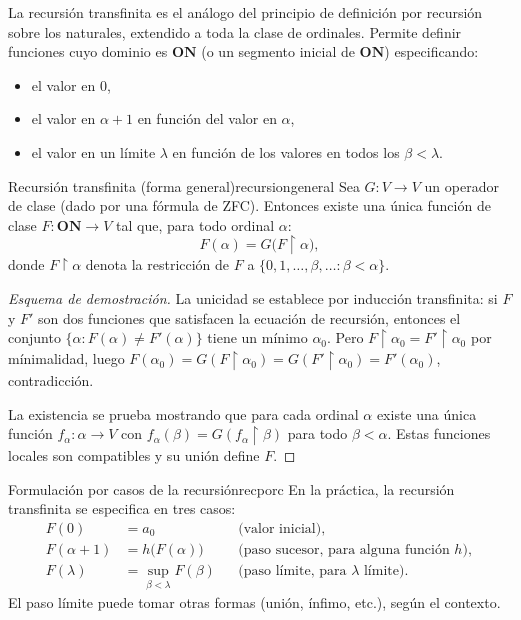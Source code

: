 La recursión transfinita es el análogo del principio de definición por recursión sobre los naturales, extendido a toda la clase de ordinales. Permite definir funciones cuyo dominio es $\mathbf{ON}$ (o un segmento inicial de $\mathbf{ON}$) especificando:
\begin{itemize}
  \item el valor en $0$,
  \item el valor en $\alpha + 1$ en función del valor en $\alpha$,
  \item el valor en un límite $\lambda$ en función de los valores en todos los $\beta < \lambda$.

\end{itemize}

\begin{teorema}{Recursión transfinita (forma general)}{recursiongeneral}
Sea $G: V \to V$ un operador de clase (dado por una fórmula de ZFC). Entonces existe una única función de clase $F: \mathbf{ON} \to V$ tal que, para todo ordinal $\alpha$:
\[
  F(\alpha) = G\bigl(F \upharpoonright \alpha\bigr),
\]
donde $F \upharpoonright \alpha$ denota la restricción de $F$ a $\{0, 1, \ldots, \beta, \ldots : \beta < \alpha\}$.
\end{teorema}

\begin{proof}[Esquema de demostración]
La unicidad se establece por inducción transfinita: si $F$ y $F'$ son dos funciones que satisfacen la ecuación de recursión, entonces el conjunto $\{\alpha : F(\alpha) \neq F'(\alpha)\}$ tiene un mínimo $\alpha_0$. Pero $F \upharpoonright \alpha_0 = F' \upharpoonright \alpha_0$ por mínimalidad, luego $F(\alpha_0) = G(F \upharpoonright \alpha_0) = G(F' \upharpoonright \alpha_0) = F'(\alpha_0)$, contradicción.

La existencia se prueba mostrando que para cada ordinal $\alpha$ existe una única función $f_\alpha: \alpha \to V$ con $f_\alpha(\beta) = G(f_\alpha \upharpoonright \beta)$ para todo $\beta < \alpha$. Estas funciones locales son compatibles y su unión define $F$.
\end{proof}

\begin{observacion}{Formulación por casos de la recursión}{recporc}
En la práctica, la recursión transfinita se especifica en tres casos:
\begin{align*}
  F(0) &= a_0 & &\text{(valor inicial)},\\
  F(\alpha + 1) &= h\bigl(F(\alpha)\bigr) & &\text{(paso sucesor, para alguna función } h\text{)},\\
  F(\lambda) &= \sup_{\beta < \lambda} F(\beta) & &\text{(paso límite, para } \lambda \text{ límite)}.
\end{align*}
El paso límite puede tomar otras formas (unión, ínfimo, etc.), según el contexto.
\end{observacion}

